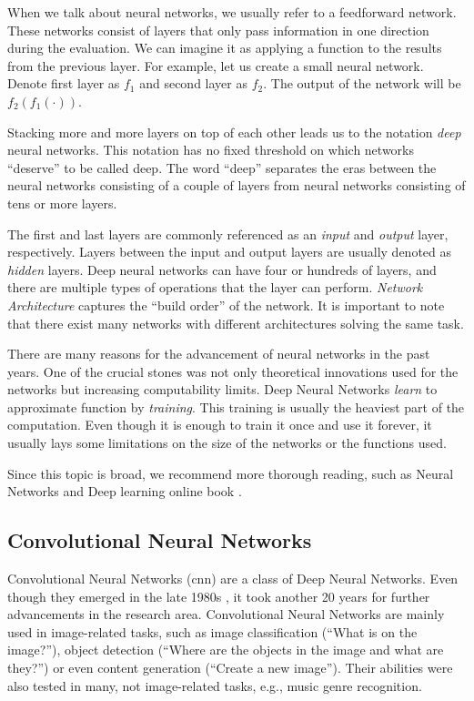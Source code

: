 When we talk about neural networks, we usually refer to a feedforward network. These networks consist of layers that only pass information in one direction during the evaluation. We can imagine it as applying a function to the results from the previous layer. For example, let us create a small neural network. Denote first layer as \(f_1\) and second layer as \(f_2\). The output of the network will be \(f_2\left(f_1\left(\cdot\right)\right)\).

Stacking more and more layers on top of each other leads us to the notation \emph{deep} neural networks. This notation has no fixed threshold on which networks ``deserve'' to be called deep. The word ``deep'' separates the eras between the neural networks consisting of a couple of layers from neural networks consisting of tens or more layers.  

The first and last layers are commonly referenced as an \emph{input} and \emph{output} layer, respectively. Layers between the input and output layers are usually denoted as \emph{hidden} layers. Deep neural networks can have four or hundreds of layers, and there are multiple types of operations that the layer can perform. \emph{Network Architecture} captures the ``build order'' of the network. It is important to note that there exist many networks with different architectures solving the same task.

There are many reasons for the advancement of neural networks in the past years. One of the crucial stones was not only theoretical innovations used for the networks but increasing computability limits. Deep Neural Networks \emph{learn} to approximate function by \emph{training}. This training is usually the heaviest part of the computation. Even though it is enough to train it once and use it forever, it usually lays some limitations on the size of the networks or the functions used.

Since this topic is broad, we recommend more thorough reading, such as Neural Networks and Deep learning online book \citep{nielsen2015neural}.

\subsection{Convolutional Neural Networks}

Convolutional Neural Networks (\acrshort{cnn}) are a class of Deep Neural Networks. Even though they emerged in the late 1980s \citep{lecun1989backpropagation}, it took another 20 years for further advancements in the research area. Convolutional Neural Networks are mainly used in image-related tasks, such as image classification (``What is on the image?''), object detection (``Where are the objects in the image and what are they?'') or even content generation (``Create a new image''). Their abilities were also tested in many, not image-related tasks, e.g., music genre recognition.

